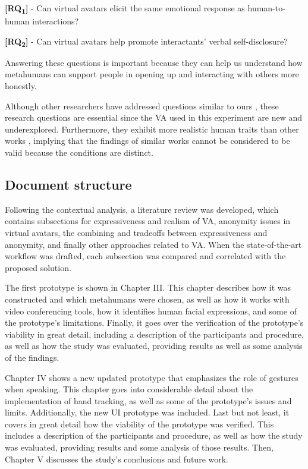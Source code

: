 \textbf{[RQ\textsubscript{1}]} - Can virtual avatars elicit the same emotional response as human-to-human interactions?

\textbf{[RQ\textsubscript{2}]} - Can virtual avatars help promote interactants' verbal self-disclosure?

Answering these questions is important because they can help us understand how metahumans can support people in opening up and interacting with others more honestly.

Although other researchers have addressed questions similar to ours \cite{LU21, ZAL18, GRA07, LUC14, ROT19, KAN16, KAN10A, BAC19}, these research questions are essential since the VA used in this experiment are new and underexplored. Furthermore, they exhibit more realistic human traits than other works \cite{LU21, ZAL18, GRA07, LUC14, ROT19, KAN16, KAN10A, BAC19}, implying that the findings of similar works cannot be considered to be valid because the conditions are distinct.

\subsection{Document structure}
Following the contextual analysis, a literature review was developed, which contains subsections for expressiveness and realism of VA, anonymity issues in virtual avatars, the combining and tradeoffs between expressiveness and anonymity, and finally other approaches related to VA. When the state-of-the-art workflow was drafted, each subsection was compared and correlated with the proposed solution.

The first prototype is shown in Chapter III. This chapter describes how it was constructed and which metahumans were chosen, as well as how it works with video conferencing tools, how it identifies human facial expressions, and some of the prototype's limitations. Finally, it goes over the verification of the prototype's viability in great detail, including a description of the participants and procedure, as well as how the study was evaluated, providing results as well as some analysis of the findings.

Chapter IV shows a new updated prototype that emphasizes the role of gestures when speaking. This chapter goes into considerable detail about the implementation of hand tracking, as well as some of the prototype's issues and limits. Additionally, the new UI prototype was included. Last but not least, it covers in great detail how the viability of the prototype was verified. This includes a description of the participants and procedure, as well as how the study was evaluated, providing results and some analysis of those results. Then, Chapter V discusses the study's conclusions and future work.